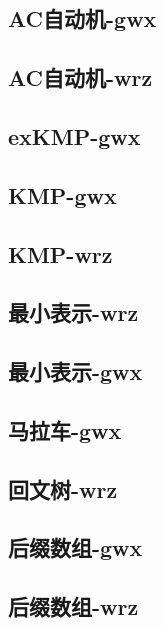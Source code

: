 \documentclass[titlepage,a4paper,10pt]{article}
\begin{document}
\begin{spacing}{0.8}
			\subsection{AC自动机-gwx}
				
			\subsection{AC自动机-wrz}
				
			\subsection{exKMP-gwx}
				
			\subsection{KMP-gwx}
				
			\subsection{KMP-wrz}
				
			\subsection{最小表示-wrz}
				
			\subsection{最小表示-gwx}
				
			\subsection{马拉车-gwx}
				
			\subsection{回文树-wrz}
				
			\subsection{后缀数组-gwx}
				
			\subsection{后缀数组-wrz}
				

\end{spacing}
\end{document}
